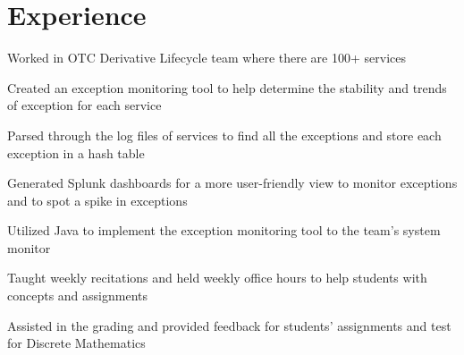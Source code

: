 \section{Experience}

\vspace{-0.5cm}
\begin{tightemize}
\item Worked in OTC Derivative Lifecycle team where there are 100+ services
\item Created an exception monitoring tool to help determine the stability and trends of exception for each service
\item Parsed through the log files of services to find all the exceptions and store each exception in a hash table
\item Generated Splunk dashboards for a more user-friendly view to monitor exceptions and to spot a spike in exceptions
\item Utilized Java to implement the exception monitoring tool to the team's system monitor 
\end{tightemize}
\vspace{0.1 cm}

\vspace{-0.5cm}
\begin{tightemize}
\item Taught weekly recitations and held weekly office hours to help students with concepts and assignments 
\item Assisted in the grading and provided feedback for students’ assignments and test for Discrete Mathematics
\end{tightemize}
\vspace{0.1 cm}


